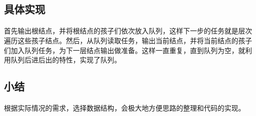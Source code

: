 \documentclass[UTF-8, 12pt]{ctexart}
\begin{document}
    \subsection{具体实现}
    \paragraph{}
    首先输出根结点，并将根结点的孩子们依次放入队列，这样下一步的任务就是层次遍历这些孩子结点。然后，从队列读取任务，输出当前结点，并将当前结点的孩子们加入队列任务，为下一层结点输出做准备。这样一直重复，直到队列为空，就利用队列后进后出的特性，实现了队列。
    \subsection{小结}
    \paragraph{}
    根据实际情况的需求，选择数据结构，会极大地方便思路的整理和代码的实现。
\end{document}
